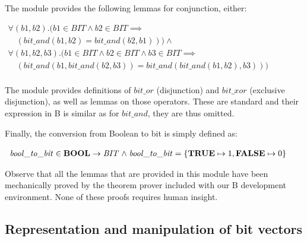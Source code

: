\documentclass[11pt]{article} %
\begin{document}
The module provides the following lemmas for conjunction, either:

$
\begin{array}{l}
\forall (\mathit{b1},\mathit{b2}).(\mathit{b1} \in \mathit{BIT} \land \mathit{b2} \in \mathit{BIT} \implies \\
\quad (\mathit{bit\_and}(\mathit{b1}, \mathit{b2}) = \mathit{bit\_and}(\mathit{b2},\mathit{b1})))\land \\
\forall (\mathit{b1},\mathit{b2},\mathit{b3}).(\mathit{b1} \in \mathit{BIT} \land  \mathit{b2} \in \mathit{BIT} \land \mathit{b3} \in \mathit{BIT} \implies \\
\quad (\mathit{bit\_and}(\mathit{b1}, \mathit{bit\_and}(\mathit{b2},\mathit{b3})) = \mathit{bit\_and}(\mathit{bit\_and}(\mathit{b1},\mathit{b2}),\mathit{b3})))\\
\end{array}
$

The module provides definitions of $\mathit{bit\_or}$ (disjunction)
and $\mathit{bit\_xor}$ (exclusive disjunction), as well as lemmas on
those operators. These are standard and their expression in B is
similar as for $\mathit{bit\_and}$, they are thus omitted.

Finally, the conversion from Boolean to bit is simply defined as:

$
\begin{array}{l}
\mathit{bool\_to\_bit} \in \operatorname{\mathbf{BOOL}} \rightarrow \mathit{BIT} \mathrel{\wedge} \mathit{bool\_to\_bit} = \{ \operatorname{\mathbf{TRUE}} \mapsto 1, \operatorname{\mathbf{FALSE}} \mapsto 0 \} \\
\end{array}
$

Observe that all the lemmas that are provided in this module have been
mechanically proved by the theorem prover included with our B
development environment. None of these proofs requires human insight.


\subsection{Representation and manipulation of bit vectors}
\end{document}
